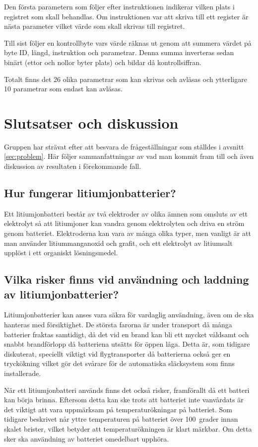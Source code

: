 \documentclass[a4paper,12pt]{article}
\begin{document}
Den första parametern som följer efter instruktionen indikerar vilken plats i registret som skall behandlas. Om instruktionen var att skriva till ett register är nästa parameter vilket värde som skall skrivas till registret. 

Till sist följer en kontrollbyte vars värde räknas ut genom att summera värdet på byte ID, längd, instruktion och parametrar. Denna summa inverteras sedan binärt (ettor och nollor byter plats) och bildar då kontrollsiffran.

Totalt finns det 26 olika parametrar som kan skrivas och avläsas och ytterligare 10 parametrar som endast kan avläsas. \cite{dyn-manual}
 
\section{Slutsatser och diskussion}
Gruppen har strävat efter att besvara de frågeställningar som ställdes i avsnitt \ref{sec:problem}. Här följer sammanfattningar av vad man kommit fram till och även diskussion av resultaten i förekommande fall.

\subsection{Hur fungerar litiumjonbatterier?}
Ett litiumjonbatteri består av två elektroder av olika ämnen som omsluts av ett elektrolyt så att litiumjoner kan vandra genom elektrolyten och driva en ström genom batteriet. Elektroderna kan vara av många olika typer, men vanligt är att man använder litiummanganoxid och grafit, och ett elektrolyt av litiumsalt upplöst i ett organiskt lösningsmedel.\cite{litium-in-cars}

\subsection{Vilka risker finns vid användning och laddning av litiumjonbatterier?}
Litiumjonbatterier kan anses vara säkra för vardaglig användning, även om de ska hanteras med försiktighet. De största farorna är under transport då många batterier fraktas samtidigt, då det vid en brand kan bli ett mycket våldsamt och snabbt brandförlopp då batteriena utsätts för öppen låga. Detta är, som tidigare diskuterat, speciellt viktigt vid flygtransporter då batterierna också ger en tryckökning vilket gör det svårare för de automatiska släcksystem som finns installerade.

När ett litiumjonbatteri används finns det också risker, framförallt då ett batteri kan börja brinna. Eftersom detta kan ske trots att batteriet inte vanvårdats är det viktigt att vara uppmärksam på temperaturökningar på batteriet. Som tidigare beskrivet når yttre temperaturen på batteriet över 100~grader innan skalet brister, vilket betyder att temperaturökningen är klart märkbar. Om detta sker ska användning av batteriet omedelbart upphöra.
\end{document}
